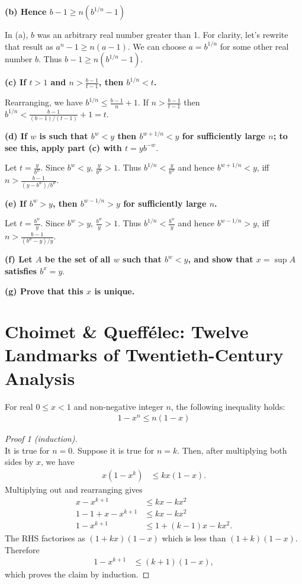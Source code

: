 \textbf{(b) Hence $b - 1 \geq n(b^{1/n} - 1)$}

In (a), $b$ was an arbitrary real number greater than 1. For clarity, let's
rewrite that result as $a^n - 1 \geq n(a-1)$. We can choose $a=b^{1/n}$ for
some other real number $b$. Thus $b - 1 \geq n(b^{1/n}-1)$.

\textbf{(c) If $t > 1$ and $n > \frac{b-1}{t-1}$, then $b^{1/n} < t$.}

Rearranging, we have $b^{1/n} \leq \frac{b-1}{n} + 1$. If $n > \frac{b-1}{t-1}$
then $b^{1/n} < \frac{b-1}{(b-1)/(t-1)} + 1 = t$.

\textbf{(d) If $w$ is such that $b^w < y$ then $b^{w + 1/n} < y$ for sufficiently
large $n$; to see this, apply part (c) with $t = yb^{-w}.$}

Let $t = \frac{y}{b^w}$. Since $b^w < y$, $\frac{y}{b^w} > 1$. Thus $b^{1/n} <
\frac{y}{b^w}$ and hence $b^{w + 1/n} < y$, iff $n > \frac{b-1}{(y -
b^w)/b^w}$.

\textbf{(e) If $b^w > y$, then $b^{w - 1/n} > y$ for sufficiently large $n$.}

Let $t = \frac{b^w}{y}$. Since $b^w > y$, $\frac{b^w}{y} > 1$. Thus $b^{1/n} <
\frac{b^w}{y}$ and hence $b^{w - 1/n} > y$, iff $n > \frac{b-1}{(b^w -
y)/y}$.


\textbf{(f) Let $A$ be the set of all $w$ such that $b^w < y$, and show that $x =
\sup A$ satisfies $b^x = y.$}

\textbf{(g) Prove that this $x$ is unique.}
\newpage
\section{Choimet \& Queffélec: Twelve Landmarks of Twentieth-Century Analysis}

\begin{claim*}
  For real $0 \leq x < 1$ and non-negative integer $n$, the following inequality holds:
  \begin{align*}
    1 - x^n \leq n(1 - x)
  \end{align*}
\end{claim*}

\begin{proof}[Proof 1 (induction)]~\\
  It is true for $n=0$. Suppose it is true for $n=k$. Then, after multiplying
  both sides by $x$, we have
  \begin{align*}
    x(1 - x^k)  &\leq kx(1 - x).
  \end{align*}
  Multiplying out and rearranging gives
  \begin{align*}
    x - x^{k+1}         &\leq kx - kx^2\\
    1 - 1 + x - x^{k+1} &\leq kx - kx^2\\
    1 - x^{k+1}         &\leq 1 + (k - 1)x - kx^2.
  \end{align*}
  The RHS factorises as $(1 + kx)(1 - x)$ which is less than
  $(1+k)(1-x)$. Therefore
   \begin{align*}
     1 - x^{k+1} &\leq (k + 1)(1 - x),
  \end{align*}
  which proves the claim by induction.
\end{proof}

